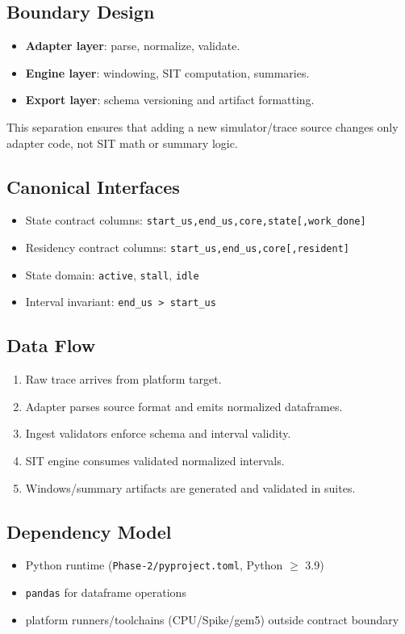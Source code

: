 \documentclass[11pt]{article}
\begin{document}
\subsection*{Boundary Design}
\begin{itemize}[leftmargin=*]
  \item \textbf{Adapter layer}: parse, normalize, validate.
  \item \textbf{Engine layer}: windowing, SIT computation, summaries.
  \item \textbf{Export layer}: schema versioning and artifact formatting.
\end{itemize}

This separation ensures that adding a new simulator/trace source changes only adapter code, not SIT math or summary logic.

\subsection*{Canonical Interfaces}
\begin{itemize}[leftmargin=*]
  \item State contract columns: \texttt{start\_us,end\_us,core,state[,work\_done]}
  \item Residency contract columns: \texttt{start\_us,end\_us,core[,resident]}
  \item State domain: \texttt{active}, \texttt{stall}, \texttt{idle}
  \item Interval invariant: \texttt{end\_us > start\_us}
\end{itemize}

\subsection*{Data Flow}
\begin{enumerate}[leftmargin=*]
  \item Raw trace arrives from platform target.
  \item Adapter parses source format and emits normalized dataframes.
  \item Ingest validators enforce schema and interval validity.
  \item SIT engine consumes validated normalized intervals.
  \item Windows/summary artifacts are generated and validated in suites.
\end{enumerate}

\subsection*{Dependency Model}
\begin{itemize}[leftmargin=*]
  \item Python runtime (\texttt{Phase-2/pyproject.toml}, Python \(\ge\) 3.9)
  \item \texttt{pandas} for dataframe operations
  \item platform runners/toolchains (CPU/Spike/gem5) outside contract boundary
\end{itemize}
\end{document}
